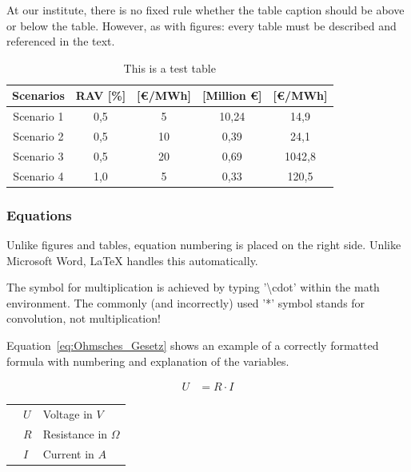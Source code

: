 \documentclass[a4paper, fleqn, headsepline, footsepline, 12pt, parskip=half]{scrartcl}
\begin{document}
At our institute, there is no fixed rule whether the table caption should be above or below the table. However, as with figures: every table must be described and referenced in the text.

\begin{table}[H]
	\centering 
	\begin{tabular}{c S[table-format=1.1] S[table-format=1.0] S[table-format=2.2] S[table-format=4.1]}
		\hline
		\textbf{Scenarios} & \textbf{RAV [\%]} & \textbf{[\euro/MWh]} & \textbf{[Million \euro]} & \textbf{[\euro/MWh]} \\
		\hline
		Scenario 1 & 0,5 & 5 & 10,24 & 14,9 \\
		Scenario 2 & 0,5 & 10 & 0,39 & 24,1 \\
		Scenario 3 & 0,5 & 20 & 0,69 & 1042,8 \\
		Scenario 4 & 1,0 & 5 & 0,33 & 120,5 \\
		\hline \hline
	\end{tabular}
	\caption{This is a test table}\label{tab:Tabelle1}
\end{table}


\subsubsection{Equations}
\label{sec:equations}

Unlike figures and tables, equation numbering is placed on the right side. Unlike Microsoft Word, LaTeX handles this automatically.

The symbol for multiplication is achieved by typing '\textbackslash cdot' within the math environment. The commonly (and incorrectly) used '*' symbol stands for convolution, not multiplication!

Equation~\ref{eq:Ohmsches_Gesetz} shows an example of a correctly formatted formula with numbering and explanation of the variables.

\begin{align}
	\label{eq:Ohmsches_Gesetz}
	U &= R \cdot I
\end{align}
\vspace*{-1cm}
\begin{table}[H]
	\begin{tabular}{@{}p{1cm}@{}p{1cm}<{\dotfill}@{}p{\dimexpr\linewidth-5cm}}
		& $U$ & Voltage in $V$  \\
		& $R$ & Resistance in $\Omega$ \\
		& $I$ & Current in $A$ 
	\end{tabular}
\end{table}
\end{document}
